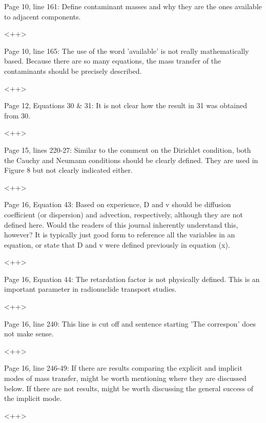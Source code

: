 \documentclass[answers,12pt]{exam}
\begin{document}
\begin{questions}
\question Page  10,  line  161:  Define  contaminant  masses  and  why  they  are  the  ones  available  to  adjacent  components. 
\begin{solution}
<++>
\end{solution} 
 
\question Page  10,  line  165:  The  use  of the word 'available' is not really mathematically based. Because there are so 
many equations, the mass transfer of the contaminants should be precisely described.  
\begin{solution}
<++>
\end{solution} 
 
\question Page 12, Equations 30 \& 31: It is not clear how the result in 31 was obtained from 30.  
\begin{solution}
<++>
\end{solution} 
 
\question Page 15, lines 220-27: Similar to the comment on the Dirichlet condition, both the Cauchy and Neumann 
conditions should be clearly defined. They are used in Figure 8 but not clearly indicated either.  
\begin{solution}
<++>
\end{solution} 
 
\question Page  16,  Equation  43:  Based  on  experience,  D  and  v  should  be  diffusion coefficient (or dispersion) and 
advection,  respectively,  although  they  are  not  defined  here.  Would  the  readers  of  this  journal inherently 
understand  this,  however?  It  is  typically  just  good  form  to  reference  all  the  variables  in  an  equation,  or 
state that D and v were defined previously in equation (x).  
\begin{solution}
<++>
\end{solution} 
 
\question Page  16,  Equation  44:  The  retardation  factor  is  not physically defined. This is an important parameter in 
radionuclide transport studies.  
\begin{solution}
<++>
\end{solution} 
 
\question Page 16, line 240: This line is cut off and sentence starting 'The correspon' does not make sense. 
\begin{solution}
<++>
\end{solution} 
 
\question Page  16,  line  246-49:  If  there  are  results  comparing  the  explicit  and  implicit  modes  of  mass  transfer,  might  be  worth  mentioning  where  they  are  discussed  below.  If  there  are  not  results,  might  be  worth 
discussing the general success of the implicit mode. 
\begin{solution}
<++>
\end{solution} 
 

\end{questions}
\end{document}
